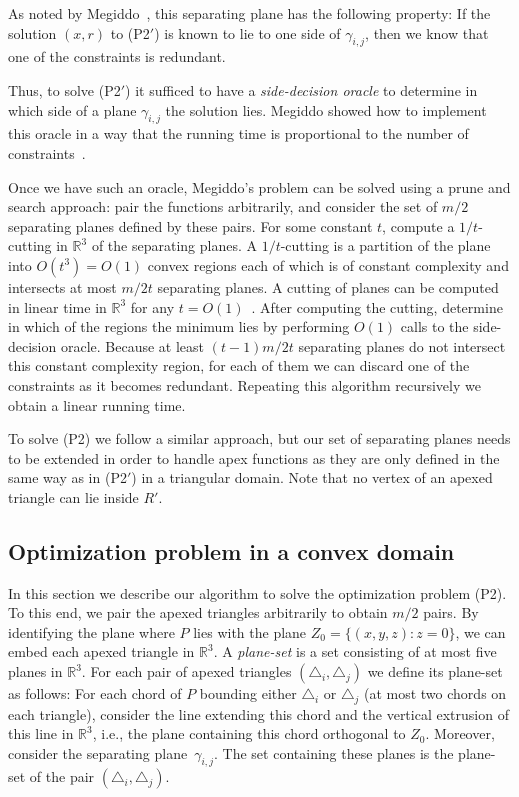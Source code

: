 \documentclass[a4paper,UKenglish]{lipics}
\newcommand{\reg}{\ensuremath{R'}}
\begin{document}
As noted by Megiddo~\cite{megiddo1989ball}, this separating plane has the following property:
If the solution $(x, r)$ to (P2$'$) is known to lie to one side of $\gamma_{i,j}$, then we know that one of the constraints is redundant. 

Thus, to solve (P2$'$) it sufficed to have a \emph{side-decision oracle} to determine in which side of a plane $\gamma_{i,j}$ the solution lies. Megiddo showed how to implement this oracle in a way that the running time is proportional to the number of constraints~\cite{megiddo1989ball}.

Once we have such an oracle, Megiddo's problem can be solved using a prune and search approach: pair the functions arbitrarily, and consider the set of $m/2$ separating planes defined by these pairs. For some constant $t$, compute a $1/t$-cutting in $\mathbb{R}^3$ of the separating planes.
A $1/t$-cutting is a partition of the plane into $O(t^3) = O(1)$ convex regions each of which is of constant complexity and intersects at most $m/2t$ separating planes.
A cutting of planes can be computed in linear time in $\mathbb{R}^3$ for any $t = O(1)$~\cite{matousekCuttings}.
After computing the cutting, determine in which of the regions the minimum lies by performing $O(1)$ calls to the side-decision oracle. 
Because at least $(t-1)m/2t$ separating planes do not intersect this constant complexity region, for each of them we can discard one of the constraints as it becomes redundant. Repeating this algorithm recursively we obtain a linear running time.

To solve (P2) we follow a similar approach, but our set of separating planes needs to be extended in order to handle apex functions as they are only defined in the same way as in (P2$'$) in a triangular domain.
Note that no vertex of an apexed triangle can lie inside $\reg$.

\subsection{Optimization problem in a convex domain}
In this section we describe our algorithm to solve the optimization problem (P2). 
To this end, we pair the apexed triangles arbitrarily to obtain $m/2$ pairs.
By identifying the plane where $P$ lies with the plane $Z_0 = \{(x,y,z): z = 0\}$, we can embed each apexed triangle in $\mathbb{R}^3$.
A \emph{plane-set} is a set consisting of at most five planes in $\mathbb{R}^3$.
For each pair of apexed triangles $(\triangle_i, \triangle_j)$ we define its plane-set as follows: 
For each chord of $P$ bounding either $\triangle_i$ or $\triangle_j$ (at most two chords on each triangle), consider the line extending this chord and the vertical extrusion of this line in $\mathbb{R}^3$, i.e., the plane containing this chord orthogonal to $Z_0$. Moreover, consider the separating plane~$\gamma_{i,j}$. The set containing these planes is the plane-set of the pair $(\triangle_i, \triangle_j)$.
\end{document}
